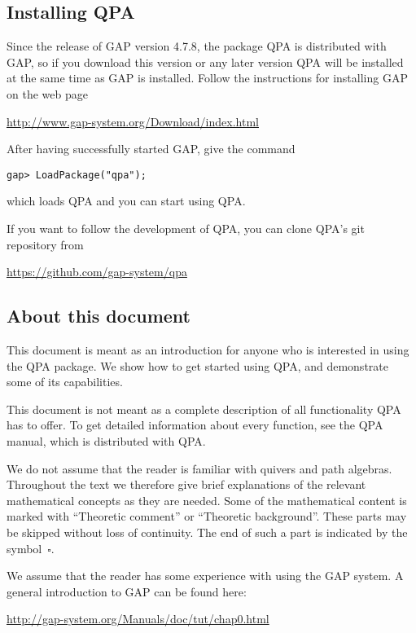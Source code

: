 \documentclass{amsart}
\theoremstyle{definition}
\theoremstyle{theoretic}
\begin{document}
\subsection{Installing QPA}
Since the release of GAP version 4.7.8, the package QPA is distributed
with GAP, so if you download this version or any later version QPA
will be installed at the same time as GAP is installed.  Follow
the instructions for installing GAP on the web page
\begin{center}
\url{http://www.gap-system.org/Download/index.html}
\end{center}
After having successfully started GAP, give the command
\begin{verbatim}
gap> LoadPackage("qpa");
\end{verbatim}
which loads QPA and you can start using QPA. 

If you want to follow the development of QPA, you can clone QPA's git
repository from
\begin{center}
\url{https://github.com/gap-system/qpa}
\end{center}

\subsection{About this document}

This document is meant as an introduction for anyone who is interested
in using the QPA package.  We show how to get started using QPA, and
demonstrate some of its capabilities.

This document is not meant as a complete description of all
functionality QPA has to offer.  To get detailed information about
every function, see the QPA manual, which is distributed with QPA.

We do not assume that the reader is familiar with quivers and path
algebras.  Throughout the text we therefore give brief explanations of
the relevant mathematical concepts as they are needed.  Some of the
mathematical content is marked with ``Theoretic comment'' or
``Theoretic background''.  These parts may be skipped without loss of
continuity.  The end of such a part is indicated by the
symbol~$\square$.

We assume that the reader has some experience with using the GAP
system.  A general introduction to GAP can be found here:
\begin{center}
\url{http://gap-system.org/Manuals/doc/tut/chap0.html}
\end{center}
\end{document}
